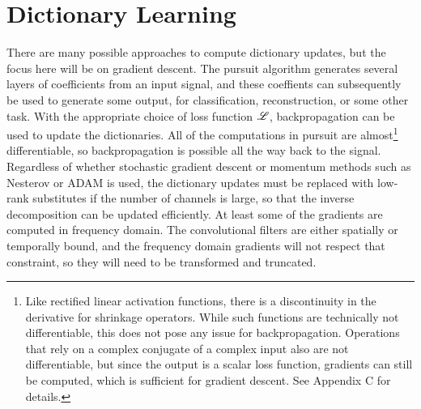 \section{Dictionary Learning}
There are many possible approaches to compute dictionary updates, but the focus here will be on gradient descent. The pursuit algorithm generates several layers of coefficients from an input signal, and these coeffients can subsequently be used to generate some output, for classification, reconstruction, or some other task. With the appropriate choice of loss function $\mathscr{L}$, backpropagation can be used to update the dictionaries. All of the computations in pursuit are almost\footnote{Like rectified linear activation functions, there is a discontinuity in the derivative for shrinkage operators. While such functions are technically not differentiable, this does not pose any issue for backpropagation. Operations that rely on a complex conjugate of a complex input also are not differentiable, but since the output is a scalar loss function, gradients can still be computed, which is sufficient for gradient descent. See Appendix C for details.} differentiable, so backpropagation is possible all the way back to the signal. Regardless of whether stochastic gradient descent or momentum methods such as Nesterov \cite{sutskever2013importance} or ADAM \cite{kingma2017adam} is used, the dictionary updates must be replaced with low-rank substitutes if the number of channels is large, so that the inverse decomposition can be updated efficiently. At least some of the gradients are computed in frequency domain. The convolutional filters are either spatially or temporally bound, and the frequency domain gradients will not respect that constraint, so they will need to be transformed and truncated.

